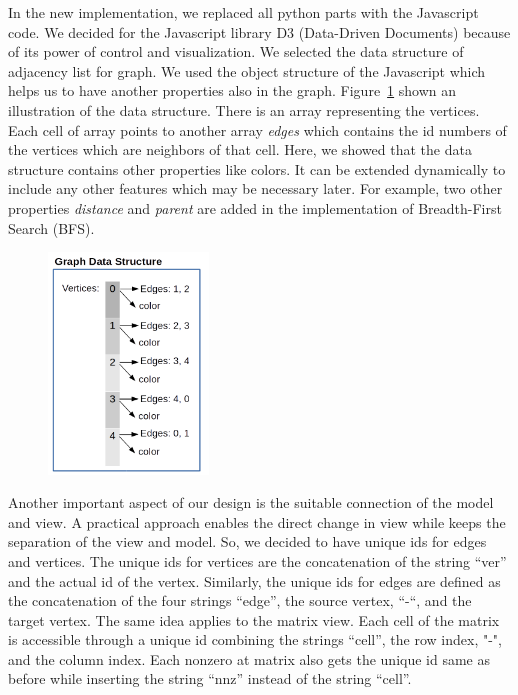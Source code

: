 \documentclass[12pt, twoside,a4paper,toc=bibliography]{scrbook}
\begin{document}
In the new implementation, we replaced all python parts with the Javascript code.
We decided for the Javascript library D3 (Data-Driven Documents)
because of its power of control and visualization.
We selected the data structure of adjacency list for graph.
We used the object structure of the Javascript which helps us to have another
properties also in the graph. Figure~\ref{f.graph-ds} shown an illustration
of the data structure. There is an array representing the vertices.
Each cell of array points to another array \textit{edges} which contains
the id numbers of the vertices which are neighbors of that cell.
Here, we showed that the data structure contains other properties like colors.
It can be extended dynamically to include any other features which may be necessary later. For example, two other properties \textit{distance} and \textit{parent} are added
in the implementation of Breadth-First Search (BFS).

\begin{figure}
\centering
\includegraphics[width=0.38\textwidth]{graph}
\caption{}
\label{f.graph-ds}
\end{figure}

Another important aspect of our design is the suitable connection of the
model and view. A practical approach enables the direct change in view while keeps the
separation of the view and model. So, we decided to have unique ids for
edges and vertices. The unique ids for vertices are the concatenation of the
string “ver” and the actual id of the vertex. Similarly, the unique ids for edges are
defined as the concatenation of the four strings “edge”, the source vertex, “-“,
and the target vertex. The same idea applies to the matrix view. Each cell of the matrix
is accessible through a unique id combining the strings “cell”, the row index,
"-", and the column index. Each nonzero at matrix also gets the unique id same as before
while inserting the string “nnz” instead of the string “cell”.
\end{document}
